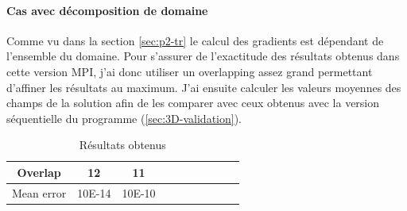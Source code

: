 \paragraph{Cas avec décomposition de domaine}
Comme vu dans la section \ref{sec:p2-tr} le calcul des gradients est dépendant de l'ensemble du domaine. Pour s'assurer de l'exactitude des résultats obtenus dans cette version MPI, j'ai donc utiliser un overlapping assez grand permettant d'affiner les résultats au maximum. J'ai ensuite calculer les valeurs moyennes des champs de la solution afin de les comparer avec ceux obtenus avec la version séquentielle du programme (\ref{sec:3D-validation}).

\begin{table}[h]
  \begin{center}
    \begin{tabular}{|c|c|c||c|c|c|c||c|c|c|}
      \hline
      Overlap & 12 & 11 \\
      \hline
      Mean error & 10E-14 & 10E-10 \\
      \hline
    
    \end{tabular}
    \caption{\label{arr:overlap_res} Résultats obtenus}
  \end{center}
\end{table}
